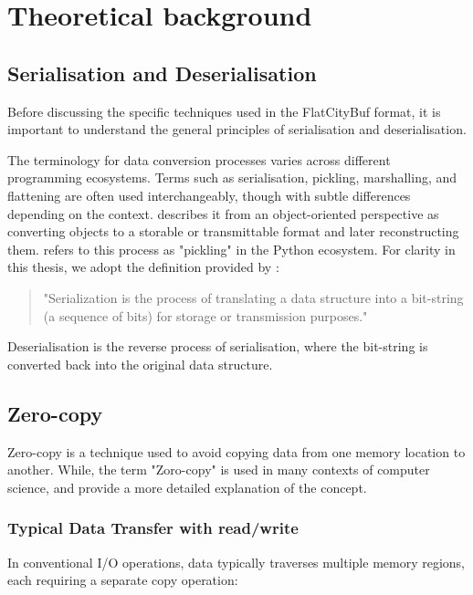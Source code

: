 \chapter{Theoretical background}
\label{chap:theoretical_background}
\section{Serialisation and Deserialisation}
\label{tb:serialisation_deserialisation}
Before discussing the specific techniques used in the FlatCityBuf format, it is important to understand the general principles of serialisation and deserialisation.

The terminology for data conversion processes varies across different programming ecosystems. Terms such as serialisation, pickling, marshalling, and flattening are often used interchangeably, though with subtle differences depending on the context. \citet{cpp_serialization} describes it from an object-oriented perspective as converting objects to a storable or transmittable format and later reconstructing them. \citet{py_serialization} refers to this process as "pickling" in the Python ecosystem. For clarity in this thesis, we adopt the definition provided by \citet{viotti_2022}:

\begin{quote}
  "Serialization is the process of translating a data structure into a bit-string (a sequence of bits) for storage or transmission purposes."
\end{quote}

Deserialisation is the reverse process of serialisation, where the bit-string is converted back into the original data structure.

\section{Zero-copy}
\label{tb:zero_copy}
Zero-copy is a technique used to avoid copying data from one memory location to another. While, the term "Zoro-copy" is used in many contexts of computer science, \citet{song2012performance}  and \citet{brose_2008_zerocopy} provide a more detailed explanation of the concept.

\subsection{Typical Data Transfer with read/write}
In conventional I/O operations, data typically traverses multiple memory regions, each requiring a separate copy operation:

